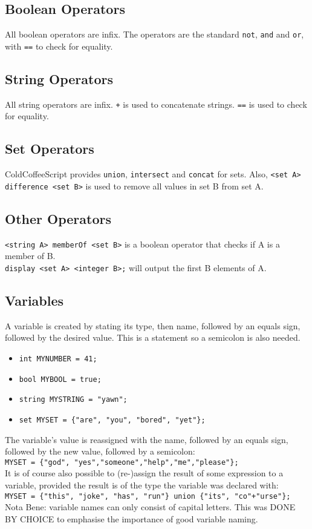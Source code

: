 \documentclass{article}
\begin{document}
\subsection{Boolean Operators}
All boolean operators are infix. The operators are the standard \lstinline|not|, \lstinline|and| and \lstinline|or|, with \lstinline|==| to check for equality.
\subsection{String Operators}
All string operators are infix. \lstinline|+| is used to concatenate strings. \lstinline|==| is used to check for equality.
\subsection{Set Operators}
ColdCoffeeScript provides \lstinline|union|, \lstinline|intersect| and \lstinline|concat| for sets. Also, \lstinline|<set A> difference <set B>| is used to remove all values in set B from set A.
\subsection{Other Operators}
\lstinline|<string A> memberOf <set B>| is a boolean operator that checks if A is a member of B.\\
\lstinline|display <set A> <integer B>;| will output the first B elements of A.
\subsection{Variables}
A variable is created by stating its type, then name, followed by an equals sign, followed by the desired value. This is a statement so a semicolon is also needed.
\begin{itemize}
\item \lstinline|int MYNUMBER = 41;|
\item \lstinline|bool MYBOOL = true;|
\item \lstinline|string MYSTRING = "yawn";|
\item \lstinline|set MYSET = {"are", "you", "bored", "yet"};|
\end{itemize}
The variable's value is reassigned with the name, followed by an equals sign, followed by the new value, followed by a semicolon: \\
\lstinline|MYSET = {"god", "yes","someone","help","me","please"};| \\
It is of course also possible to (re-)assign the result of some expression to a variable, provided the result is of the type the variable was declared with: \\
\lstinline|MYSET = {"this", "joke", "has", "run"} union {"its", "co"+"urse"};| \\
Nota Bene: variable names can only consist of capital letters. This was DONE BY CHOICE to emphasise the importance of good variable naming.
\end{document}
